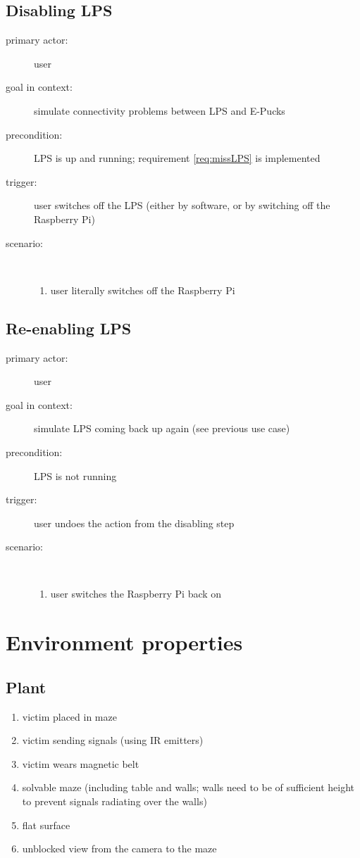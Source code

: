 \documentclass[a4paper,parskip,headheight=38pt]{scrartcl} %
\begin{document}
\subsection{Disabling LPS}
\begin{description}
\item[primary actor:] user
\item[goal in context:] simulate connectivity problems between LPS and E-Pucks
\item[precondition:] LPS is up and running; requirement \ref{req:missLPS} is implemented
\item[trigger:] user switches off the LPS (either by software, or by switching off the Raspberry Pi)
\item[scenario:] \ 
\begin{enumerate}
	\item user literally switches off the Raspberry Pi
\end{enumerate}
\end{description}

\subsection{Re-enabling LPS}
\begin{description}
\item[primary actor:] user
\item[goal in context:] simulate LPS coming back up again (see previous use case)
\item[precondition:] LPS is not running
\item[trigger:] user undoes the action from the disabling step
\item[scenario:]\
\begin{enumerate}
	\item user switches the Raspberry Pi back on
\end{enumerate}
\end{description}

\section{Environment properties}

\subsection{Plant}
\begin{enumerate}[label=\plant]
\item victim placed in maze
\item victim sending signals (using IR emitters)
\item victim wears magnetic belt
\item solvable maze (including table and walls; walls need to be of sufficient height to prevent signals radiating over the walls)
\item flat surface
\item unblocked view from the camera to the maze
\end{enumerate}
\end{document}
